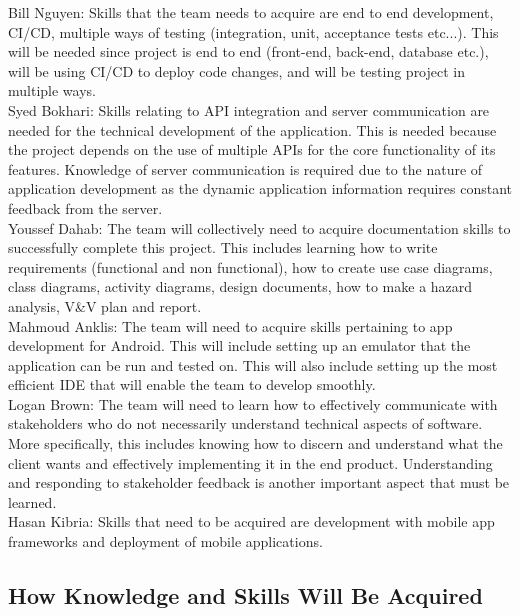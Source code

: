 \documentclass[12pt,letterpaper]{article}
\begin{document}
\noindent Bill Nguyen: Skills that the team needs to acquire are end to end development, CI/CD, multiple ways of testing (integration, unit, acceptance tests etc...). This will be needed since project is end to end (front-end, back-end, database etc.), will be using CI/CD to deploy code changes, and will be testing project in multiple ways.\\

\noindent Syed Bokhari: Skills relating to API integration and server communication are needed for the technical development of the application. This is needed because the project depends on the use of multiple APIs for the core functionality of its features. Knowledge of server communication is required due to the nature of application development as the dynamic application information requires constant feedback from the server. \\

\noindent Youssef Dahab: The team will collectively need to acquire documentation skills to successfully complete this project. This includes learning how to write requirements (functional and non functional), how to create use case diagrams, class diagrams, activity diagrams, design documents, how to make a hazard analysis, V\&V plan and report.\\

\noindent Mahmoud Anklis: The team will need to acquire skills pertaining to app development for Android. This will include setting up an emulator that the application can be run and tested on. This will also include setting up the most efficient IDE that will enable the team to develop smoothly.\\ 

\noindent Logan Brown: The team will need to learn how to effectively communicate with stakeholders who do not necessarily understand technical aspects of software. More specifically, this includes knowing how to discern and understand what the client wants and effectively implementing it in the end product. Understanding and responding to stakeholder feedback is another important aspect that must be learned.\\

\noindent Hasan Kibria: Skills that need to be acquired are development with mobile app frameworks and deployment of mobile applications.\\

\subsection{How Knowledge and Skills Will Be Acquired}
\end{document}
